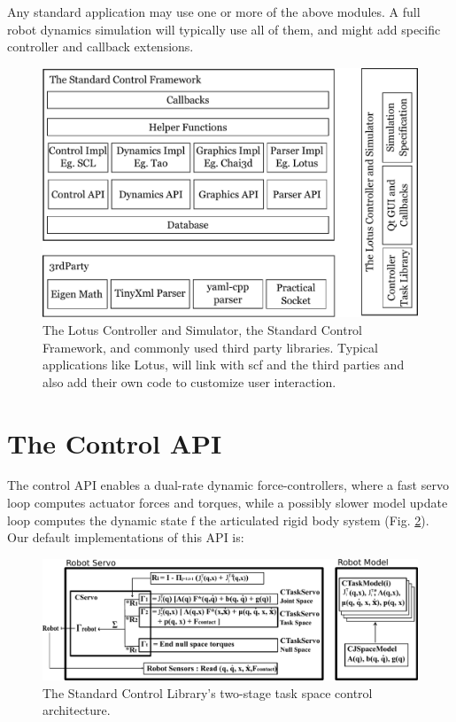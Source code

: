 \documentclass[12pt]{article}
\begin{document}
Any standard application may use one or more of the above modules. A full robot 
dynamics simulation will typically use all of them, and might add specific controller
and callback extensions.

\begin{figure}
\begin{center}
\includegraphics{figs/scf.pdf}
\end{center}
\caption{The Lotus Controller and Simulator, the Standard Control Framework, and 
commonly used third party libraries. Typical applications like Lotus, will link with
scf and the third parties and also add their own code to customize user interaction.}
\label{fig:scf}
\end{figure}

\section{The Control API}

The control API enables a dual-rate dynamic force-controllers, where a fast servo
loop computes actuator forces and torques, while a possibly slower model update loop
computes the dynamic state f the articulated rigid body system (Fig. \ref{fig:scl}). 
Our default implementations of this API is:

\begin{figure}[t!]
\begin{center}
\includegraphics[width=7in]{figs/controller.pdf}
\end{center}
\caption{The Standard Control Library's two-stage task space control architecture.}
\label{fig:scl}
\end{figure}
\end{document}
